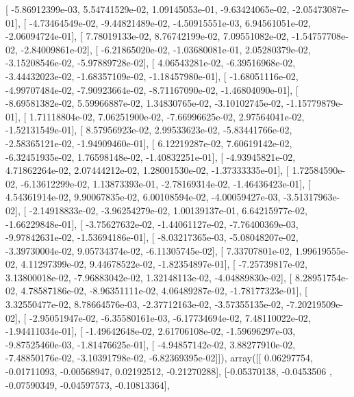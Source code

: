 \documentclass{article}
\begin{document}
       [ -5.86912399e-03,   5.54741529e-02,   1.09145053e-01,
         -9.63424065e-02,  -2.05473087e-01],
       [ -4.73464549e-02,  -9.44821489e-02,  -4.50915551e-03,
          6.94561051e-02,  -2.06094724e-01],
       [  7.78019133e-02,   8.76742199e-02,   7.09551082e-02,
         -1.54757708e-02,  -2.84009861e-02],
       [ -6.21865020e-02,  -1.03680081e-01,   2.05280379e-02,
         -3.15208546e-02,  -5.97889728e-02],
       [  4.06543281e-02,  -6.39516968e-02,  -3.44432023e-02,
         -1.68357109e-02,  -1.18457980e-01],
       [ -1.68051116e-02,  -4.99707484e-02,  -7.90923664e-02,
         -8.71167090e-02,  -1.46804090e-01],
       [ -8.69581382e-02,   5.59966887e-02,   1.34830765e-02,
         -3.10102745e-02,  -1.15779879e-01],
       [  1.71118804e-02,   7.06251900e-02,  -7.66996625e-02,
          2.97564041e-02,  -1.52131549e-01],
       [  8.57956923e-02,   2.99533623e-02,  -5.83441766e-02,
         -2.58365121e-02,  -1.94909460e-01],
       [  6.12219287e-02,   7.60619142e-02,  -6.32451935e-02,
          1.76598148e-02,  -1.40832251e-01],
       [ -4.93945821e-02,   4.71862264e-02,   2.07444212e-02,
          1.28001530e-02,  -1.37333335e-01],
       [  1.72584590e-02,  -6.13612299e-02,   1.13873393e-01,
         -2.78169314e-02,  -1.46436423e-01],
       [  4.54361914e-02,   9.90067835e-02,   6.00108594e-02,
         -4.00059427e-03,  -3.51317963e-02],
       [ -2.14918833e-02,  -3.96254279e-02,   1.00139137e-01,
          6.64215977e-02,  -1.66229848e-01],
       [ -3.75627632e-02,  -1.44061127e-02,  -7.76400369e-03,
         -9.97842631e-02,  -1.53694186e-01],
       [ -8.03217365e-03,  -5.08048207e-02,  -3.39730004e-02,
          9.05734374e-02,  -6.11305745e-02],
       [  7.33707801e-02,   1.99619555e-02,   4.11297399e-02,
          9.44678522e-02,  -1.82354897e-01],
       [ -7.25739817e-02,   3.13800018e-02,  -7.96883042e-02,
          1.32148113e-02,  -4.04889830e-02],
       [  8.28951754e-02,   4.78587186e-02,  -8.96351111e-02,
          4.06489287e-02,  -1.78177323e-01],
       [  3.32550477e-02,   8.78664576e-03,  -2.37712163e-02,
         -3.57355135e-02,  -7.20219509e-02],
       [ -2.95051947e-02,  -6.35580161e-03,  -6.17734694e-02,
          7.48110022e-02,  -1.94411034e-01],
       [ -1.49642648e-02,   2.61706108e-02,  -1.59696297e-03,
         -9.87525460e-03,  -1.81476625e-01],
       [ -4.94857142e-02,   3.88277910e-02,  -7.48850176e-02,
         -3.10391798e-02,  -6.82369395e-02]]), array([[ 0.06297754, -0.01711093, -0.00568947,  0.02192512, -0.21270288],
       [-0.05370138, -0.0453506 , -0.07590349, -0.04597573, -0.10813364],
\end{document}
